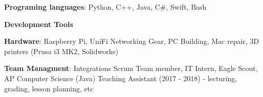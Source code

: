 

\begin{cventries}
\vspace{-5mm}
  \cventry
    {}
    {}
    {}
    {}
    {
      \begin{cvitems}
        \item {\textbf{Programing languages}: Python, C++, Java, C\#, Swift, Bash}
        \item {\textbf{Development Tools}}
        \item {\textbf{Hardware}: Raspberry Pi, UniFi Networking Gear,
            PC Building, Mac repair, 3D printers (Prusa i3 MK2,
            Solidworks)}
        \item {\textbf{Team Managment}:  Integrations Scrum Team
            member, IT Intern, Eagle Scout, AP Computer Science (Java) Teaching
            Assistant (2017 - 2018) - lecturing, grading, lesson
            planning, etc}
      \end{cvitems}
    }
\end{cventries}